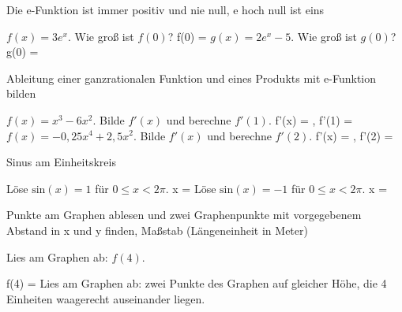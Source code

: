 \begin{aufgabe}{Die e-Funktion ist immer positiv und nie null, e hoch null ist eins}
\begin{teile}
\teil $f(x) = 3e^x$. Wie groß ist $f(0)$? f(0) = \leerfeld
\teil $g(x) = 2e^x - 5$. Wie groß ist $g(0)$? g(0) = \leerfeld
\end{teile}
\end{aufgabe}

\begin{aufgabe}{Ableitung einer ganzrationalen Funktion und eines Produkts mit e-Funktion bilden}
\begin{teile}
\teil $f(x) = x^3 - 6x^2$. Bilde $f'(x)$ und berechne $f'(1)$. f'(x) = \leerfeld , f'(1) = \leerfeld
\teil $f(x) = -0{,}25x^4 + 2{,}5x^2$. Bilde $f'(x)$ und berechne $f'(2)$. f'(x) = \leerfeld , f'(2) = \leerfeld
\end{teile}
\end{aufgabe}

\begin{aufgabe}{Sinus am Einheitskreis}
\begin{teile}
\teil Löse $\mathrm{sin}(x) = 1$ für $0 \le x < 2\pi$. x = \leerfeld
\teil Löse $\mathrm{sin}(x) = -1$ für $0 \le x < 2\pi$. x = \leerfeld
\end{teile}
\end{aufgabe}

\begin{aufgabe}{Punkte am Graphen ablesen und zwei Graphenpunkte mit vorgegebenem Abstand in x und y finden, Maßstab (Längeneinheit in Meter)}
\begin{teile}
\teil Lies am Graphen ab: $f(4)$.

\begin{ksys}[xmin=-1,xmax=5,ymin=-1,ymax=6,ablesen]  \end{ksys}
f(4) = \leerfeld
\teil Lies am Graphen ab: zwei Punkte des Graphen auf gleicher Höhe, die 4 Einheiten waagerecht auseinander liegen.

\begin{ksys}[xmin=-1,xmax=5,ymin=-1,ymax=6,ablesen]  \end{ksys}
\end{teile}
\end{aufgabe}

